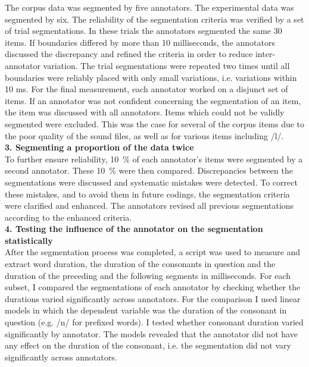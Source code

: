 The corpus data was segmented by five annotators. The experimental data was segmented by six. The reliability of the segmentation criteria was verified by a set of trial segmentations.  In these trials the annotators segmented the same 30 items. If boundaries differed by more than 10 milliseconds, the annotators discussed the discrepancy and refined the criteria in order to reduce inter-annotator variation. The trial segmentations were repeated two times until all boundaries were reliably placed with only small variations, i.e. variations within 10 ms. For the final measurement, each annotator worked on a disjunct set of items. If an annotator was not confident concerning the segmentation of an item, the item was discussed with all annotators. Items which could not be validly segmented were excluded. This was the case for several of the corpus items due to the poor quality of the sound files, as well as for various items including /l/. \\%

\textbf{ 3. Segmenting a proportion of the data twice}\\

To further ensure reliability, 10~\% of each annotator's items were segmented by a second annotator. These 10~\% were then compared. Discrepancies between the segmentations were discussed and systematic mistakes were detected. To correct these mistakes, and to avoid them in future codings, the segmentation criteria were clarified and enhanced. The annotators revised all previous segmentations according to the enhanced criteria.\\


\textbf{ 4. Testing the influence of the annotator on the segmentation statistically}\\

After the segmentation process was completed, a script was used to measure and extract word duration, the duration of the consonants in question and the duration of the preceding and the following segments in milliseconds. For each subset,  I compared the segmentations of each annotator by checking whether the durations varied significantly across annotators.
 For the comparison I used linear models in which the dependent variable was the duration of the consonant in question (e.g. /n/ for prefixed words). I tested whether consonant duration varied significantly by annotator. The models revealed that the annotator did not have any effect on the duration of the consonant, i.e. the segmentation did not vary significantly across annotators.


